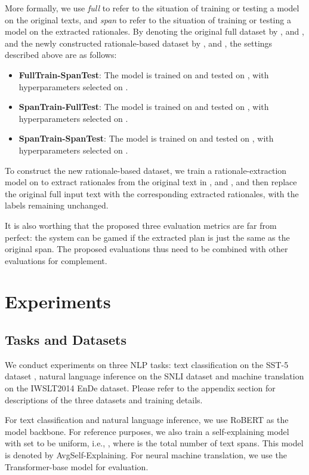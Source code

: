 \documentclass[11pt,a4paper]{article}
\begin{document}
   More formally, we use 
 {\it full} to refer to the situation of training or testing a model
on the original texts, 
 and  {\it span} to refer to the situation of training or testing a model
on the extracted rationales.  
By denoting the original full dataset by ,  and , and the newly constructed rationale-based dataset by ,  and , the settings described above are as follows: 
\begin{itemize}
  \item {\bf FullTrain-SpanTest}: The model is trained on  and tested on , with hyperparameters selected on .
  \item {\bf SpanTrain-FullTest}: The model is trained on  and tested on , with hyperparameters selected on .
  \item {\bf SpanTrain-SpanTest}: The model is trained on  and tested on , with hyperparameters selected on .
\end{itemize}
To construct the new rationale-based dataset, we train a rationale-extraction model on  to extract rationales from the original text in ,  and , and then replace the original full input text with the corresponding extracted rationales, with the labels remaining unchanged.

It is also worthing that the proposed three evaluation metrics are far from perfect: the system can be gamed 
 if the extracted plan is just the same as the original span. The proposed evaluations thus need to be combined with other evaluations for complement.

\section{Experiments}
\subsection{Tasks and Datasets}
We conduct experiments on three NLP tasks: text classification on the SST-5 dataset \cite{socher2013recursive},
natural language inference on the SNLI dataset \cite{bowman2015large} 
and  machine translation on the IWSLT2014 EnDe dataset. 
Please refer to the appendix section for descriptions of the three datasets and training details. 



For text classification and natural language inference, we use RoBERT \citep{yinhan2019roberta}
as the model backbone.  
For reference purposes, we also train a self-explaining model with  set to be uniform, i.e., , where  is the total number of text spans. This model is denoted by AvgSelf-Explaining. 
For neural machine translation, we use the Transformer-base \citep{vaswani2017attention} model for evaluation.
\end{document}
